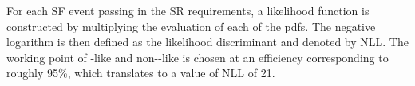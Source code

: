 For each SF event passing in the SR requirements, a likelihood function is constructed by multiplying the evaluation of each of the pdfs.
The negative logarithm is then defined as the likelihood discriminant and denoted by NLL.
The working point of \ttbar-like and non-\ttbar-like is chosen at an efficiency corresponding to roughly 95\%, which translates to a value of NLL of 21.
